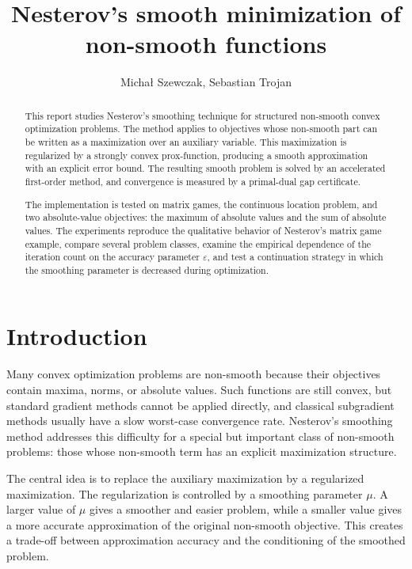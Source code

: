 \documentclass[11pt]{article}
\title{Nesterov's smooth minimization of non-smooth functions}
\author{Michał Szewczak, Sebastian Trojan}
\date{}
\begin{document}
\maketitle

\begin{abstract}

This report studies Nesterov's smoothing technique for structured non-smooth
convex optimization problems. The method applies to objectives whose
non-smooth part can be written as a maximization over an auxiliary variable.
This maximization is regularized by a strongly convex prox-function, producing
a smooth approximation with an explicit error bound. The resulting smooth
problem is solved by an accelerated first-order method, and convergence is
measured by a primal-dual gap certificate.

The implementation is tested on matrix games, the continuous location problem,
and two absolute-value objectives: the maximum of absolute values and the sum
of absolute values. The experiments reproduce the qualitative behavior of
Nesterov's matrix game example, compare several problem classes, examine the
empirical dependence of the iteration count on the accuracy parameter
\(\varepsilon\), and test a continuation strategy in which the smoothing
parameter is decreased during optimization.

\end{abstract}

\tableofcontents
\newpage


\section{Introduction}

Many convex optimization problems are non-smooth because their objectives
contain maxima, norms, or absolute values. Such functions are still convex, but
standard gradient methods cannot be applied directly, and classical subgradient
methods usually have a slow worst-case convergence rate. Nesterov's smoothing
method addresses this difficulty for a special but important class of
non-smooth problems: those whose non-smooth term has an explicit maximization
structure.

The central idea is to replace the auxiliary maximization by a regularized
maximization. The regularization is controlled by a smoothing parameter
\(\mu\). A larger value of \(\mu\) gives a smoother and easier problem, while a
smaller value gives a more accurate approximation of the original non-smooth
objective. This creates a trade-off between approximation accuracy and the
conditioning of the smoothed problem.
\end{document}
